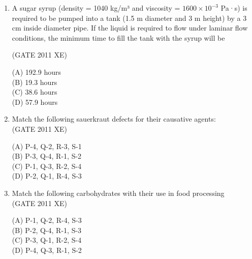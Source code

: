 \documentclass[journal,12pt,onecolumn]{IEEEtran}
\begin{document}
\begin{enumerate}
\begin{enumerate}
\begin{enumerate}
\hfill{(GATE 2011 XE)} \\
\begin{multicols}{4}
(A) 20.5 \% \\
(B) 25.4 \% \\
(C) 41.5 \% \\
(D) 45.2 \%
\end{multicols}

\item A sugar syrup (density = 1040 kg/m³ and viscosity = $1600 \times 10^{-3}$ Pa·s) is required to be pumped into a tank (1.5 m diameter and 3 m height) by a 3 cm inside diameter pipe. If the liquid is required to flow under laminar flow conditions, the minimum time to fill the tank with the syrup will be

\hfill{(GATE 2011 XE)} \\
\begin{multicols}{4}
(A) 192.9 hours \\
(B) 19.3 hours \\
(C) 38.6 hours \\
(D) 57.9 hours
\end{multicols}


\item Match the following sauerkraut defects for their causative agents: \\



\hfill{(GATE 2011 XE)} \\
\begin{multicols}{2}
(A) P-4, Q-2, R-3, S-1 \\
(B) P-3, Q-4, R-1, S-2 \\
(C) P-1, Q-3, R-2, S-4 \\
(D) P-2, Q-1, R-4, S-3
\end{multicols}

\item Match the following carbohydrates with their use in food processing \\




\hfill{(GATE 2011 XE)} \\
\begin{multicols}{2}
(A) P-1, Q-2, R-4, S-3 \\
(B) P-2, Q-4, R-1, S-3 \\
(C) P-3, Q-1, R-2, S-4 \\
(D) P-4, Q-3, R-1, S-2
\end{multicols}


\end{enumerate}
\end{enumerate}
\end{enumerate}
\end{document}
